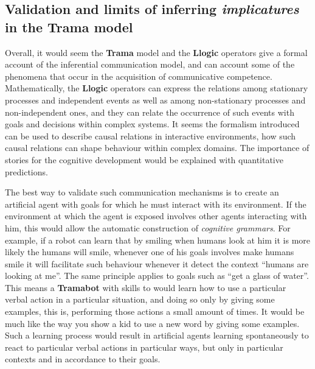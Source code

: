 \documentclass[
		twoside,openright,titlepage,numbers=noenddot,manychapters,
		headinclude,%
                footinclude=false,cleardoublepage=empty,
                BCOR=5mm,
		fontsize=11pt, %
                 enabledeprecatedfontcommands]{scrreprt}
\begin{document}
\subsection{Validation and limits of inferring \emph{implicatures} in the \textbf{Trama} model}




\label{discuss_stories}

Overall, it would seem the \textbf{Trama} model and the \textbf{Llogic} operators give a formal account of the inferential communication model, and can account some of the phenomena that occur in the acquisition of communicative competence. 
Mathematically, the \textbf{Llogic} operators can express the relations among stationary processes and independent events as well as among non-stationary processes and non-independent ones, and they can relate the occurrence of such events with goals and decisions within complex systems. 
It seems the formalism introduced can be used to describe causal relations in interactive environments, how such causal relations can shape behaviour within complex domains. The importance of stories for the cognitive development would be explained with quantitative predictions. %



The best way to validate such communication mechanisms is to create an artificial agent with goals for which he must interact with its environment. If the environment at which the agent is exposed involves other agents interacting with him,  this would allow the automatic construction of  \emph{cognitive grammars}. For example, if a robot can learn that by smiling when humans look at him it is more likely the humans will smile, whenever one of his goals involves make humans smile it will facilitate such behaviour whenever it detect the context ``humans are looking at me''. The same principle applies to goals such as ``get a glass of water''.
This means a \textbf{Tramabot} with skills to  would learn how to use a particular verbal action in a particular situation, and doing so only by giving some examples, this is, performing those actions a small amount of times. It would be much like the way you show a kid to use a new word by giving some examples. Such a learning process would result in artificial agents learning spontaneously to  react to particular verbal actions in particular ways, but only in particular contexts and in accordance to their goals. 
\end{document}
